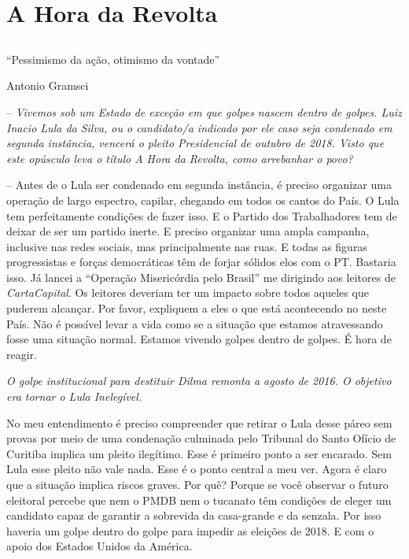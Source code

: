 \part{A Hora da Revolta}

\chapter*{}

\epigraph{``Pessimismo da ação, otimismo da vontade''}{Antonio Gramsci}


\newcommand{\falaG}{\itshape}
\newcommand{\falaM}{\normalfont}

\parindent0pt
\parskip4pt

 -- \itshape Vivemos sob um Estado de exceção em que golpes nascem dentro de
golpes. Luiz Inacio Lula da Silva, ou o candidato/a indicado por ele
caso seja condenado em segunda instância, vencerá o pleito Presidencial
de outubro de 2018. Visto que este opúsculo leva o título \emph{A Hora
da Revolta}, como arrebanhar o povo?

\normalfont{} -- \normalfont Antes de o Lula ser condenado em segunda instância, é preciso
organizar uma operação de largo espectro, capilar, chegando em todos os
cantos do País. O Lula tem perfeitamente condições de fazer isso. E o
Partido dos Trabalhadores tem de deixar de ser um partido inerte. E
preciso organizar uma ampla campanha, inclusive nas redes sociais, mas
principalmente nas ruas. E todas as figuras progressistas e forças
democráticas têm de forjar sólidos elos com o PT. Bastaria isso. Já
lancei a ``Operação Misericórdia pelo Brasil'' me dirigindo aos leitores
de \emph{CartaCapital}. Os leitores deveriam ter um impacto sobre todos
aqueles que puderem alcançar. Por favor, expliquem a eles o que está
acontecendo no neste País. Não é possível levar a vida como se a
situação que estamos atravessando fosse uma situação normal. Estamos
vivendo golpes dentro de golpes. É hora de reagir.

\falaG O golpe institucional para destituir Dilma remonta a agosto de 2016.
O objetivo era tornar o Lula Inelegível.

\falaM No meu entendimento é preciso compreender que retirar o Lula desse
páreo sem provas por meio de uma condenação culminada pelo Tribunal do
Santo Ofício de Curitiba implica um pleito ilegítimo. Esse é primeiro
ponto a ser encarado. Sem Lula esse pleito não vale nada. Esse é o ponto
central a meu ver. Agora é claro que a situação implica riscos graves.
Por quê? Porque se você observar o futuro eleitoral percebe que nem o
PMDB nem o tucanato têm condições de eleger um candidato capaz de
garantir a sobrevida da casa-grande e da senzala. Por isso haveria um
golpe dentro do golpe para impedir as eleições de 2018. E com o apoio
dos Estados Unidos da América.

